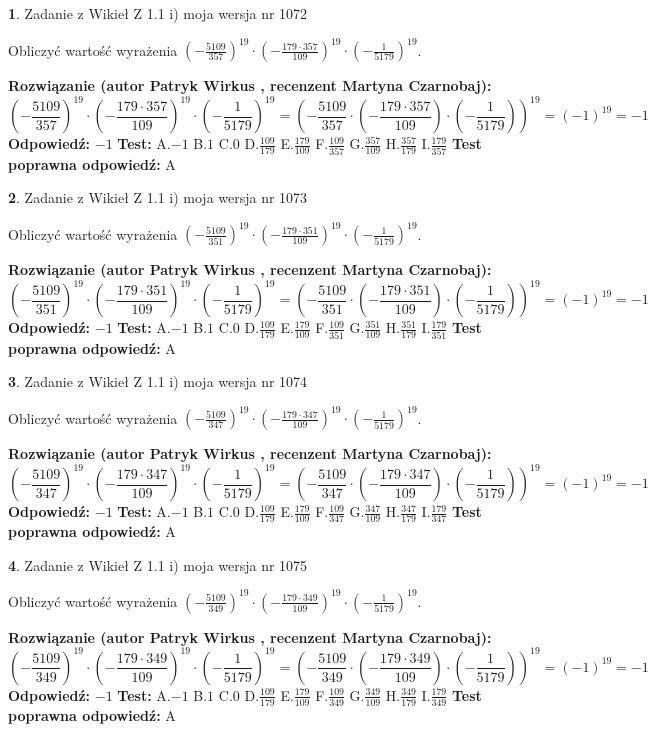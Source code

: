 \documentclass[12pt, a4paper]{article}
\theoremstyle{definition} %
\newtheorem{zad}{}
\newcommand{\zadStart}[1]{\begin{zad}#1\newline}
\newcommand{\zadStop}{\end{zad}}
\newcommand{\rozwStart}[2]{\noindent \textbf{Rozwiązanie (autor #1 , recenzent #2): }\newline}
\newcommand{\rozwStop}{\newline}
\newcommand{\odpStart}{\noindent \textbf{Odpowiedź:}\newline}
\newcommand{\odpStop}{\newline}
\newcommand{\testStart}{\noindent \textbf{Test:}\newline}
\newcommand{\testStop}{\newline}
\newcommand{\kluczStart}{\noindent \textbf{Test poprawna odpowiedź:}\newline}
\newcommand{\kluczStop}{\newline}
\begin{document}
\zadStart{Zadanie z Wikieł Z 1.1 i) moja wersja nr 1072}

Obliczyć wartość wyrażenia $(-\frac{5109}{357})^{19} \cdot (-\frac{179 \cdot 357}{109})^{19} \cdot (-\frac{1}{5179})^{19}$.
\zadStop
\rozwStart{Patryk Wirkus}{Martyna Czarnobaj}
$$(-\frac{5109}{357})^{19} \cdot (-\frac{179 \cdot 357}{109})^{19} \cdot (-\frac{1}{5179})^{19} = (-\frac{5109}{357} \cdot (-\frac{179 \cdot 357}{109}) \cdot (-\frac{1}{5179}))^{19} = (-1)^{19} = -1$$
\rozwStop
\odpStart
$-1$
\odpStop
\testStart
A.$-1$ B.$1$ C.$0$ D.$\frac{109}{179}$ E.$\frac{179}{109}$
F.$\frac{109}{357}$ G.$\frac{357}{109}$
H.$\frac{357}{179}$
I.$\frac{179}{357}$
\testStop
\kluczStart
A
\kluczStop



\zadStart{Zadanie z Wikieł Z 1.1 i) moja wersja nr 1073}

Obliczyć wartość wyrażenia $(-\frac{5109}{351})^{19} \cdot (-\frac{179 \cdot 351}{109})^{19} \cdot (-\frac{1}{5179})^{19}$.
\zadStop
\rozwStart{Patryk Wirkus}{Martyna Czarnobaj}
$$(-\frac{5109}{351})^{19} \cdot (-\frac{179 \cdot 351}{109})^{19} \cdot (-\frac{1}{5179})^{19} = (-\frac{5109}{351} \cdot (-\frac{179 \cdot 351}{109}) \cdot (-\frac{1}{5179}))^{19} = (-1)^{19} = -1$$
\rozwStop
\odpStart
$-1$
\odpStop
\testStart
A.$-1$ B.$1$ C.$0$ D.$\frac{109}{179}$ E.$\frac{179}{109}$
F.$\frac{109}{351}$ G.$\frac{351}{109}$
H.$\frac{351}{179}$
I.$\frac{179}{351}$
\testStop
\kluczStart
A
\kluczStop



\zadStart{Zadanie z Wikieł Z 1.1 i) moja wersja nr 1074}

Obliczyć wartość wyrażenia $(-\frac{5109}{347})^{19} \cdot (-\frac{179 \cdot 347}{109})^{19} \cdot (-\frac{1}{5179})^{19}$.
\zadStop
\rozwStart{Patryk Wirkus}{Martyna Czarnobaj}
$$(-\frac{5109}{347})^{19} \cdot (-\frac{179 \cdot 347}{109})^{19} \cdot (-\frac{1}{5179})^{19} = (-\frac{5109}{347} \cdot (-\frac{179 \cdot 347}{109}) \cdot (-\frac{1}{5179}))^{19} = (-1)^{19} = -1$$
\rozwStop
\odpStart
$-1$
\odpStop
\testStart
A.$-1$ B.$1$ C.$0$ D.$\frac{109}{179}$ E.$\frac{179}{109}$
F.$\frac{109}{347}$ G.$\frac{347}{109}$
H.$\frac{347}{179}$
I.$\frac{179}{347}$
\testStop
\kluczStart
A
\kluczStop



\zadStart{Zadanie z Wikieł Z 1.1 i) moja wersja nr 1075}

Obliczyć wartość wyrażenia $(-\frac{5109}{349})^{19} \cdot (-\frac{179 \cdot 349}{109})^{19} \cdot (-\frac{1}{5179})^{19}$.
\zadStop
\rozwStart{Patryk Wirkus}{Martyna Czarnobaj}
$$(-\frac{5109}{349})^{19} \cdot (-\frac{179 \cdot 349}{109})^{19} \cdot (-\frac{1}{5179})^{19} = (-\frac{5109}{349} \cdot (-\frac{179 \cdot 349}{109}) \cdot (-\frac{1}{5179}))^{19} = (-1)^{19} = -1$$
\rozwStop
\odpStart
$-1$
\odpStop
\testStart
A.$-1$ B.$1$ C.$0$ D.$\frac{109}{179}$ E.$\frac{179}{109}$
F.$\frac{109}{349}$ G.$\frac{349}{109}$
H.$\frac{349}{179}$
I.$\frac{179}{349}$
\testStop
\kluczStart
A
\kluczStop
\end{document}
